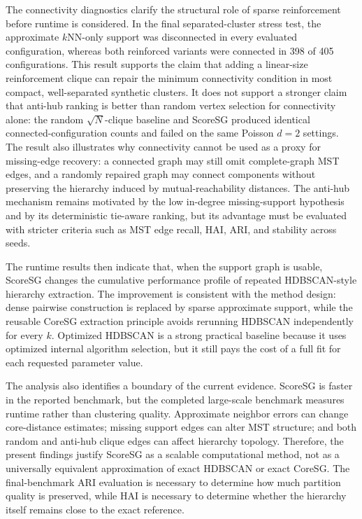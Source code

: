 \documentclass[11pt]{article}
\begin{document}
The connectivity diagnostics clarify the structural role of sparse reinforcement before runtime is considered. In the final separated-cluster stress test, the approximate \(k\)NN-only support was disconnected in every evaluated configuration, whereas both reinforced variants were connected in 398 of 405 configurations. This result supports the claim that adding a linear-size reinforcement clique can repair the minimum connectivity condition in most compact, well-separated synthetic clusters. It does not support a stronger claim that anti-hub ranking is better than random vertex selection for connectivity alone: the random \(\sqrt{N}\)-clique baseline and ScoreSG produced identical connected-configuration counts and failed on the same Poisson \(d=2\) settings. The result also illustrates why connectivity cannot be used as a proxy for missing-edge recovery: a connected graph may still omit complete-graph MST edges, and a randomly repaired graph may connect components without preserving the hierarchy induced by mutual-reachability distances. The anti-hub mechanism remains motivated by the low in-degree missing-support hypothesis and by its deterministic tie-aware ranking, but its advantage must be evaluated with stricter criteria such as MST edge recall, HAI, ARI, and stability across seeds.

The runtime results then indicate that, when the support graph is usable, ScoreSG changes the cumulative performance profile of repeated HDBSCAN-style hierarchy extraction. The improvement is consistent with the method design: dense pairwise construction is replaced by sparse approximate support, while the reusable CoreSG extraction principle avoids rerunning HDBSCAN independently for every \(k\). Optimized HDBSCAN is a strong practical baseline because it uses optimized internal algorithm selection, but it still pays the cost of a full fit for each requested parameter value.

The analysis also identifies a boundary of the current evidence. ScoreSG is faster in the reported benchmark, but the completed large-scale benchmark measures runtime rather than clustering quality. Approximate neighbor errors can change core-distance estimates; missing support edges can alter MST structure; and both random and anti-hub clique edges can affect hierarchy topology. Therefore, the present findings justify ScoreSG as a scalable computational method, not as a universally equivalent approximation of exact HDBSCAN or exact CoreSG. The final-benchmark ARI evaluation is necessary to determine how much partition quality is preserved, while HAI is necessary to determine whether the hierarchy itself remains close to the exact reference.
\end{document}

